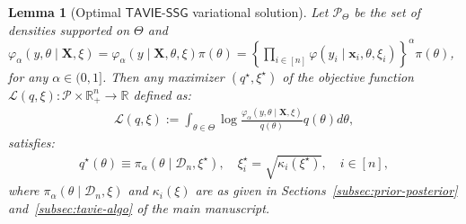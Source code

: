 \documentclass[12pt]{article}
\newtheorem{lemma}{Lemma}[section]
\numberwithin{equation}{section}
\newcommand{\tssg}{\mathsf{TAVIE}\text{-}\mathsf{SSG}}
\begin{document}
\begin{lemma}[Optimal $\tssg$ variational solution]\label{lemma-variational-optimizer}
Let $\mathcal{P}_{\Theta}$ be the set of densities supported on $\Theta$ and $\varphi_{\alpha}(y, \theta\mid \mathbf{X}, \xi) = \varphi_{\alpha}(y\mid \mathbf{X}, \theta, \xi)\pi(\theta) = \left\{\prod_{i\in [n]}\varphi(y_i\mid \mathbf{x}_i, \theta, \xi_i)\right\}^{\alpha}\pi(\theta)$, for any $\alpha \in (0,1]$. Then any maximizer $(q^\star, \xi^\star)$ of the objective function $\mathcal{L}(q, \xi):\mathcal{P}\times \mathbb{R}^n_{+}\rightarrow \mathbb{R}$ defined as:
%
\begin{align}\label{eq:objective-function}
   \mathcal{L}(q, \xi) := \int_{\theta\in \Theta}\log\frac{\varphi_{\alpha}(y, \theta\mid \mathbf{X}, \xi)}{q(\theta)}q(\theta)d\theta,
\end{align}
%
satisfies:
%
\begin{align}\label{eq:lemma-optimal-variational-solution}
    q^\star(\theta) \equiv \pi_{\alpha}(\theta\mid \mathcal{D}_n, \xi^{\star}), \quad 
    \xi_i^{\star} = \sqrt{\kappa_i(\xi^\star)}, \quad i\in [n],
\end{align}
%
where $\pi_{\alpha}(\theta\mid \mathcal{D}_n, \xi)$ and $\kappa_{i}(\xi)$ are as given in Sections~\ref{subsec:prior-posterior} and~\ref{subsec:tavie-algo} of the main manuscript.
\end{lemma}
%
\end{document}
